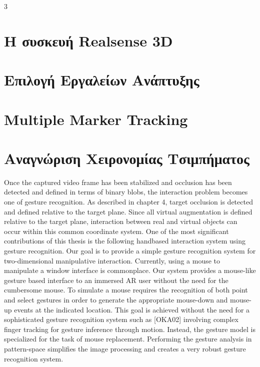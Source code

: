3%


 \label{c:crypto}


\section{Η συσκευή Realsense 3D }
\section{Επιλογή Εργαλείων Ανάπτυξης}

\section{Multiple Marker Tracking}
\section{Αναγνώριση Χειρονομίας Τσιμπήματος}

Once the captured video frame has been stabilized and occlusion has been detected and defined in terms of binary blobs, the interaction problem becomes one of gesture recognition. As described in chapter 4, target occlusion is detected and defined relative to the target plane. Since all virtual augmentation is defined relative to the target plane, interaction between real and virtual objects can occur within this common coordinate system. One of the most significant contributions of this thesis is the following handbased interaction system using gesture recognition. Our goal is to provide a simple gesture recognition system for two-dimensional manipulative interaction. Currently, using a mouse to manipulate a window interface is commonplace. Our system provides a mouse-like gesture based interface to an immersed AR user without the need for the cumbersome mouse. To simulate a mouse requires the recognition of both point and select gestures in order to generate the appropriate mouse-down and mouse-up events at the indicated location. This goal is achieved without the need for a sophisticated gesture recognition system such as [OKA02] involving complex finger tracking for gesture inference through motion. Instead, the gesture model is specialized for the task of mouse replacement. Performing the gesture analysis in pattern-space simplifies the image processing and creates a very robust gesture recognition system.

